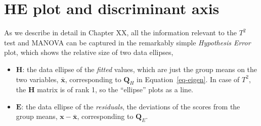 \documentclass[
  letterpaper,
  10pt,
  krantz2]{krantz}
\makeatletter
\newenvironment{Shaded}{\begin{snugshade}}{\end{snugshade}}
\newcommand{\CommentTok}[1]{\textcolor[rgb]{0.37,0.37,0.37}{#1}}
\newcommand{\DecValTok}[1]{\textcolor[rgb]{0.68,0.00,0.00}{#1}}
\newcommand{\FunctionTok}[1]{\textcolor[rgb]{0.28,0.35,0.67}{#1}}
\newcommand{\NormalTok}[1]{\textcolor[rgb]{0.00,0.23,0.31}{#1}}
\newcommand{\OtherTok}[1]{\textcolor[rgb]{0.00,0.23,0.31}{#1}}
\newcommand{\SpecialCharTok}[1]{\textcolor[rgb]{0.37,0.37,0.37}{#1}}
\providecommand{\tightlist}{%
  \setlength{\itemsep}{0pt}\setlength{\parskip}{0pt}}\usepackage{longtable,booktabs,array}
\newenvironment{kframe}{%
  \medskip{}
  \setlength{\fboxsep}{.8em}
  \def\at@end@of@kframe{}%
  \ifinner\ifhmode%
  \def\at@end@of@kframe{\end{minipage}}%
  \begin{minipage}{\columnwidth}%
  \fi\fi%
  \def\FrameCommand##1{\hskip\@totalleftmargin \hskip-\fboxsep
  \colorbox{shadecolor}{##1}\hskip-\fboxsep
      \hskip-\linewidth \hskip-\@totalleftmargin \hskip\columnwidth}%
  \MakeFramed {\advance\hsize-\width
    \@totalleftmargin\z@ \linewidth\hsize
    \@setminipage}}%
{\par\unskip\endMakeFramed%
  \at@end@of@kframe}
\renewenvironment{Shaded}{\begin{kframe}}{\end{kframe}}
\makeatother
\begin{document}
\section{HE plot and discriminant
axis}\label{he-plot-and-discriminant-axis}

As we describe in detail in Chapter XX, all the information relevant to
the \(T^2\) test and MANOVA can be captured in the remarkably simple
\emph{Hypothesis Error} plot, which shows the relative size of two data
ellipses,

\begin{itemize}
\tightlist
\item
  \(\mathbf{H}\): the data ellipse of the \emph{fitted} values, which
  are just the group means on the two variables, \(\bar{\mathbf{x}}\),
  corresponding to \(\mathbf{Q}_H\) in Equation~\ref{eq-eigen}. In case
  of \(T^2\), the \(\mathbf{H}\) matrix is of rank 1, so the ``ellipse''
  plots as a line.
\end{itemize}

\begin{Shaded}
\end{Shaded}

\begin{itemize}
\tightlist
\item
  \(\mathbf{E}\): the data ellipse of the \emph{residuals}, the
  deviations of the scores from the group means,
  \(\mathbf{x} - \bar{\mathbf{x}}\), corresponding to \(\mathbf{Q}_E\).
\end{itemize}
\end{document}
